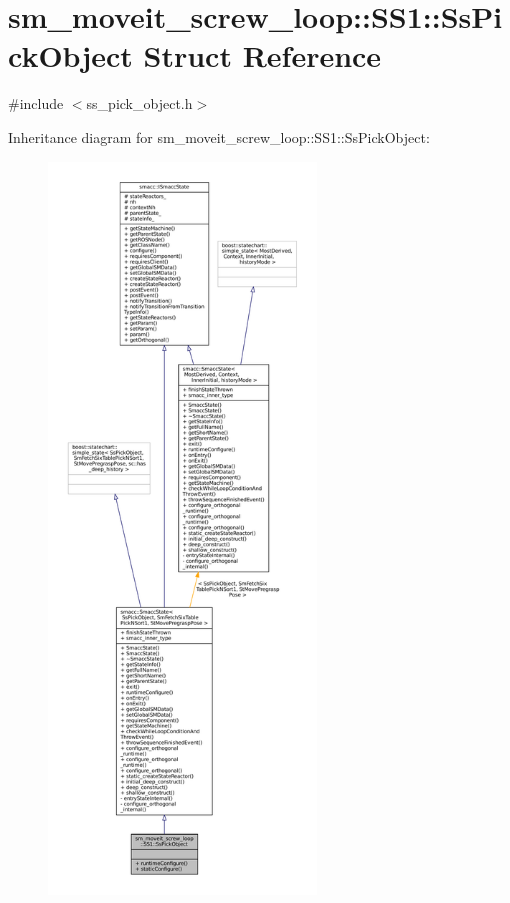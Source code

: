 \hypertarget{structsm__moveit__screw__loop_1_1SS1_1_1SsPickObject}{}\section{sm\+\_\+moveit\+\_\+screw\+\_\+loop\+:\+:S\+S1\+:\+:Ss\+Pick\+Object Struct Reference}
\label{structsm__moveit__screw__loop_1_1SS1_1_1SsPickObject}


{\ttfamily \#include $<$ss\+\_\+pick\+\_\+object.\+h$>$}



Inheritance diagram for sm\+\_\+moveit\+\_\+screw\+\_\+loop\+:\+:S\+S1\+:\+:Ss\+Pick\+Object\+:
\nopagebreak
\begin{figure}[H]
\begin{center}
\leavevmode
\includegraphics[height=550pt]{structsm__moveit__screw__loop_1_1SS1_1_1SsPickObject__inherit__graph}
\end{center}
\end{figure}


